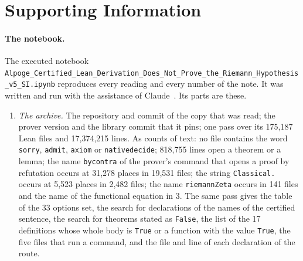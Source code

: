 \documentclass[11pt]{article}
\theoremstyle{definition}
\theoremstyle{remark}
\DeclareRobustCommand{\lean}[1]{{\renewcommand{\_}{\textunderscore\allowbreak}\texttt{#1}}}
\newcommand{\True}{\lean{True}}
\newcommand{\False}{\lean{False}}
\begin{document}
\appendix

\section{Supporting Information}\label{app:si}

\paragraph{The notebook.} The executed notebook \nolinkurl{Alpoge_Certified_Lean_Derivation_Does_Not_Prove_the_Riemann_Hypothesis_v5_SI.ipynb} reproduces every reading and every number of the note. It was written and run with the assistance of Claude~\citep{claude}. Its parts are these.
\begin{enumerate}[leftmargin=2em,itemsep=1pt]
\item \emph{The archive.} The repository and commit of the copy that was read; the prover version and the library commit that it pins; one pass over its 175{,}187 Lean files and 17{,}374{,}215 lines. As counts of text: no file contains the word \lean{sorry}, \lean{admit}, \lean{axiom} or \lean{native\_decide}; 818{,}755 lines open a theorem or a lemma; the name \lean{by\_contra} of the prover's command that opens a proof by refutation occurs at 31{,}278 places in 19{,}531 files; the string \lean{Classical.} occurs at 5{,}523 places in 2{,}482 files; the name \lean{riemannZeta} occurs in 141 files and the name of the functional equation in 3. The same pass gives the table of the 33 options set, the search for declarations of the names of the certified sentence, the search for theorems stated as \False, the list of the 17 definitions whose whole body is \True{} or a function with the value \True, the five files that run a command, and the file and line of each declaration of the route.

\end{enumerate}
\end{document}
